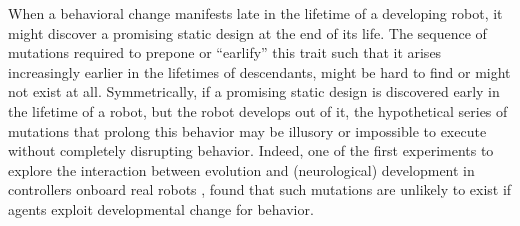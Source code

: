When a behavioral change manifests late in the lifetime of a developing robot, it might discover a promising static design at the end of its life.
The sequence of mutations required to prepone or ``earlify'' this trait such that it arises increasingly earlier in the lifetimes of descendants, might be hard to find or might not exist at all.
Symmetrically, if a promising static design is discovered early in the lifetime of a robot, but the robot develops out of it, the hypothetical series of mutations that prolong this behavior may be 
illusory or impossible to execute without completely disrupting behavior.
Indeed, one of the first experiments to explore the interaction between evolution and (neurological) development in controllers onboard real robots \cite{floreano1996plastic}, found that such mutations are unlikely to exist if agents exploit developmental change for behavior.


